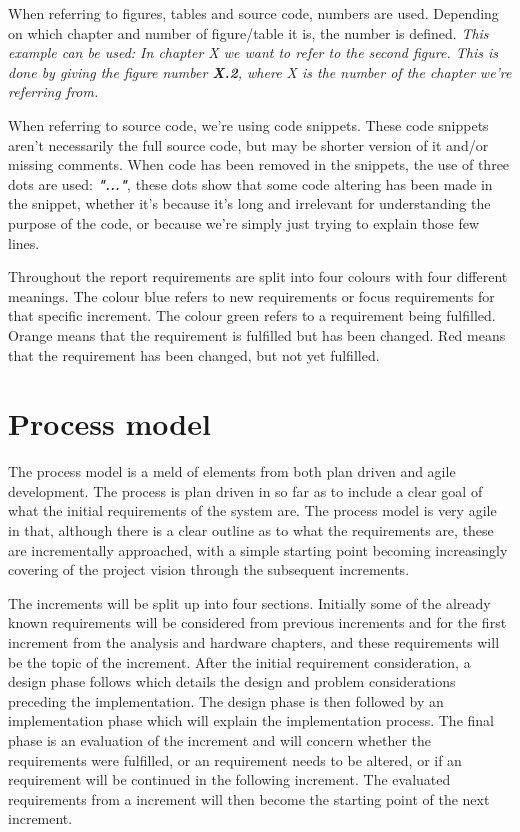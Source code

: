 When referring to figures, tables and source code, numbers are used. Depending on which chapter and number of figure/table it is, the number is defined. \newline
\textit{This example can be used: In chapter X we want to refer to the second figure. This is done by giving the figure number \textbf{X.2}, where X is the number of the chapter we're referring from.}
\newline

When referring to source code, we're using code snippets. These code snippets aren't necessarily the full source code, but may be shorter version of it and/or missing comments. When code has been removed in the snippets, the use of three dots are used:  \textit\textbf{{"..."}}, these dots show that some code altering has been made in the snippet, whether it's because it's long and irrelevant for understanding the purpose of the code, or because we're simply just trying to explain those few lines. 

Throughout the report requirements are split into four colours with four different meanings. The colour blue refers to new requirements or focus requirements for that specific increment. The colour green refers to a requirement being fulfilled. Orange means that the requirement is fulfilled but has been changed. Red means that the requirement has been changed, but not yet fulfilled. 


\chapter*{Process model}
The process model is a meld of elements from both plan driven and agile development. The process is plan driven in so far as to include a clear goal of what the initial requirements of the system are. The process model is very agile in that, although there is a clear outline as to what the requirements are, these are incrementally approached, with a simple starting point becoming increasingly covering of the project vision through the subsequent increments.

The increments will be split up into four sections. Initially some of the already known requirements will be considered from previous increments and for the first increment from the analysis and hardware chapters, and these requirements will be the topic of the increment.
After the initial requirement consideration, a design phase follows which details the design and problem considerations preceding the implementation. The design phase is then followed by an implementation phase which will explain the implementation process. The final phase is an evaluation of the increment and will concern whether the requirements were fulfilled, or an requirement needs to be altered, or if an requirement will be continued in the following increment. The evaluated requirements from a increment will then become the starting point of the next increment. 

